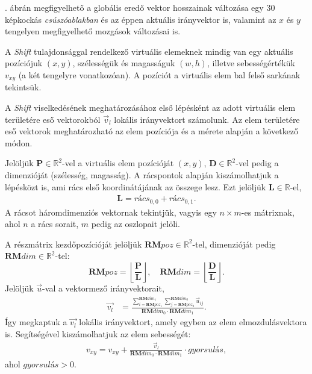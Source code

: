 . ábrán megfigyelhető a globális eredő vektor hosszainak változása egy 30 képkockás \textit{csúszóablakban} és az éppen aktuális irányvektor is, valamint az $x$ és $y$ tengelyen megfigyelhető mozgások változásai is.


A \textit{Shift} tulajdonsággal rendelkező virtuális elemeknek mindig van egy aktuális pozíciójuk $(x,y)$, szélességük és magasságuk $(w,h)$, illetve sebességértékük $v_{xy}$ (a két tengelyre vonatkozóan). A pozíciót a virtuális elem bal felső sarkának tekintsük.

A \textit{Shift} viselkedésének meghatározásához első lépésként az adott virtuális elem területére eső vektorokból $\vec{v}_l$  lokális irányvektort számolunk. Az elem területére eső vektorok meghatározható az elem pozíciója és a mérete alapján a következő módon.

Jelöljük $\boldsymbol P \in \mathbb{R}^2$-vel a virtuális elem pozícióját $(x,y)$, $\boldsymbol D \in \mathbb{R}^2$-vel pedig a dimenzióját (szélesség, magasság).
A rácspontok alapján kiszámolhatjuk a lépésközt is, ami rács első koordinátájának az összege lesz. Ezt jelöljük $\boldsymbol L \in \mathbb{R}$-el,
\begin{align*}
	\boldsymbol L = \textit{rács}_{0,0} + \textit{rács}_{0,1}.
\end{align*}
A rácsot háromdimenziós vektornak tekintjük, vagyis egy $n\times m$-es mátrixnak, ahol $n$ a rács sorait, $m$ pedig az oszlopait jelöli.

A részmátrix kezdőpozícióját jelöljük $\boldsymbol {RM}poz \in \mathbb{R}^2$-tel,
dimenzióját pedig \\
$\boldsymbol {RM}dim \in \mathbb{R}^2$-tel:
\[
	\boldsymbol {RM}poz = \left\lfloor \frac{\boldsymbol P}{\boldsymbol L} \right\rfloor, \quad
	\boldsymbol {RM}dim = \left\lfloor \frac{\boldsymbol D}{\boldsymbol L} \right\rfloor.
\]
Jelöljük $\vec{u}$-val a vektormező irányvektorait,
\begin{align*}
  \displaystyle \vec{v_l} &= \frac{\sum_{i=\boldsymbol {RM}poz_1}^{\boldsymbol {RM}dim_1} \sum_{j=\boldsymbol {RM}poz_0}^{\boldsymbol {RM}dim_0} \vec{u}_{ij}}{\boldsymbol {RM}dim_0 \cdot \boldsymbol {RM}dim_1}.
\end{align*}
Így megkaptuk a $\vec{v_l}$ lokális irányvektort, amely egyben az elem elmozdulásvektora is. Segítségével kiszámolhatjuk az elem sebességét:
\begin{align*}
  v_{xy} = v_{xy} + \frac{\vec{v}_l}{\boldsymbol {RM}dim_0 \cdot \boldsymbol {RM}dim_1} \cdot \textit{gyorsulás},
\end{align*}
ahol $\textit{gyorsulás} > 0$.

